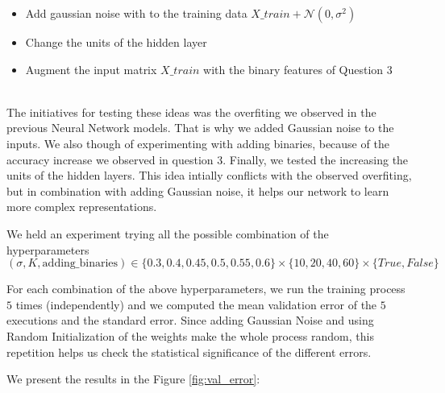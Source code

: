 \documentclass{article}
\begin{document}
\begin{itemize}
    \item Add gaussian noise with to the training data $X\_train + \mathcal{N}(0,\sigma^2)$
    \item Change the units of the hidden layer
    \item Augment the input matrix $X\_train$ with the binary features of Question $3$
\end{itemize}\\

The initiatives for testing these ideas was the overfiting we observed in the previous Neural Network models. That is why we added Gaussian noise to the inputs. We also though of experimenting with adding binaries, because of the accuracy increase we observed in question 3. Finally, we tested the increasing the units of the hidden layers. This idea intially conflicts with the observed overfiting, but in combination with adding Gaussian noise, it helps our network to learn more complex representations.

We held an experiment trying all the possible combination of the hyperparameters \\ $$(\sigma, K, \text{adding\_binaries}) \in \{0.3, 0.4, 0.45, 0.5, 0.55, 0.6\}\times \{10, 20, 40, 60\}\times \{True, False\}$$

For each combination of the above hyperparameters, we run the training process $5$ times (independently) and we computed the mean validation error of the $5$ executions and the standard error. Since adding Gaussian Noise and using Random Initialization of the weights make the whole process random, this repetition helps us check the statistical significance of the different errors.

We present the results in the Figure \ref{fig:val_error}:
\end{document}
